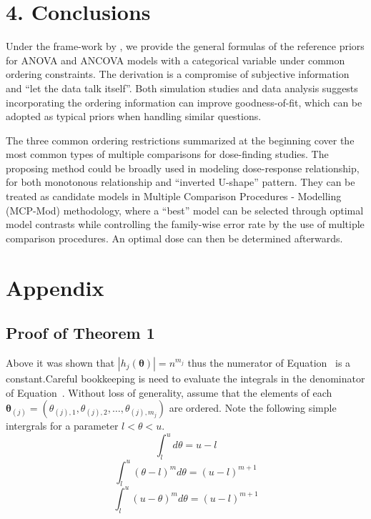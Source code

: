 \documentclass[Proceedings]{ascelike}
\begin{document}
\section{4. Conclusions}
Under the frame-work by \cite{BergerBernardo1992}, we provide the
general formulas of the reference priors for ANOVA and ANCOVA models
with a categorical variable under common ordering constraints. The
derivation is a compromise of subjective information and ``let the
data talk itself''. Both simulation studies and data analysis suggests
incorporating the ordering information can improve goodness-of-fit,
which can be adopted as typical priors when handling similar
questions.

The three common ordering restrictions summarized at the beginning
cover the most common types of multiple comparisons for dose-finding
studies. The proposing method could be broadly used in modeling
dose-response relationship, for both monotonous relationship and
``inverted U-shape'' pattern. They can be treated as candidate models
in Multiple Comparison Procedures - Modelling (MCP-Mod) methodology,
where a ``best'' model can be selected through optimal model contrasts
while controlling the family-wise error rate by the use of multiple
comparison procedures. An optimal dose can then be determined
afterwards.

\pagebreak
%
%
%
\section*{Appendix}

\subsection*{Proof of Theorem 1}

Above it was shown that $|h_j(\boldsymbol{\theta})|=n^{m_j}$ thus the
numerator of Equation~\cite{Lemma1} is a constant.Careful bookkeeping
is need to evaluate the integrals in the denominator of
Equation~\cite{Lemma1}. Without loss of generality, assume that the
elements of each $\boldsymbol{\theta}_{(j)}=(\theta_{(j),1},
\theta_{(j),2}, \ldots, \theta_{(j),m_j})$ are ordered. Note the
following simple intergrals for a parameter $l<\theta<u$.
\[
\int_l^u d\theta = u-l
\]
\[
\int_l^u (\theta-l)^m d\theta = (u-l)^{m+1}
\]
\[
\int_l^u (u-\theta)^m d\theta = (u-l)^{m+1}
\]
\end{document}
